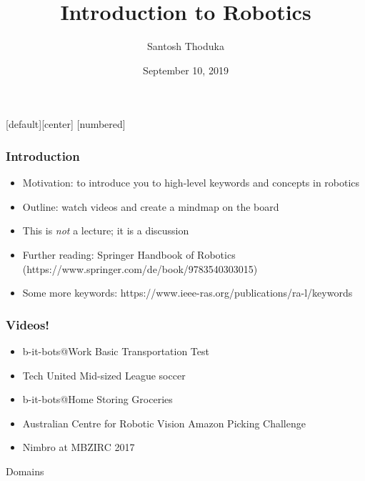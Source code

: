 \documentclass{beamer}
\title[]{Introduction to Robotics}
\author[Santosh Thoduka]{Santosh Thoduka}
\institute[HBRS]{Hochschule Bonn Rhein Sieg}
\date{September 10, 2019}
\begin{document}
[default][center]
[numbered]
\captionsetup[subfigure]{labelformat=empty}

\begin{frame}[plain]
\addtocounter{framenumber}{-1}
\maketitle
\end{frame}

\begin{frame}
\frametitle{Introduction}
\begin{itemize}
    \item Motivation: to introduce you to high-level keywords and concepts in robotics
    \item Outline: watch videos and create a mindmap on the board
    \item This is \emph{not} a lecture; it is a discussion
    \item Further reading: Springer Handbook of Robotics (https://www.springer.com/de/book/9783540303015)
    \item Some more keywords: https://www.ieee-ras.org/publications/ra-l/keywords
\end{itemize}

\end{frame}

\begin{frame}
\frametitle{Videos!}
\begin{itemize}
\item <1-> b-it-bots@Work Basic Transportation Test
\item <2-> Tech United Mid-sized League soccer
\item <3-> b-it-bots@Home Storing Groceries
\item <4-> Australian Centre for Robotic Vision Amazon Picking Challenge
\item <5-> Nimbro at MBZIRC 2017
\end{itemize}

\end{frame}

\begin{frame}[standout]
     Domains
\end{frame}
\end{document}
